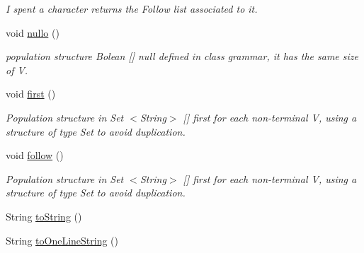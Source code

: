 \begin{DoxyCompactItemize}
\begin{DoxyCompactList}\small\item\em I spent a character returns the Follow list associated to it. \end{DoxyCompactList}\item 
void \hyperlink{classcontext_free_1_1grammar_1_1_context_free_grammar_ac880ed3ca36ddcd8e20d8279af08244d}{nullo} ()
\begin{DoxyCompactList}\small\item\em population structure Bolean \mbox{[}\mbox{]} null defined in class grammar, it has the same size of V. \end{DoxyCompactList}\item 
void \hyperlink{classcontext_free_1_1grammar_1_1_context_free_grammar_a9c3bfe0b038204420b470fab326ce7bb}{first} ()
\begin{DoxyCompactList}\small\item\em Population structure in Set $<$\-String$>$ \mbox{[}\mbox{]} first for each non-\/terminal V, using a structure of type Set to avoid duplication. \end{DoxyCompactList}\item 
void \hyperlink{classcontext_free_1_1grammar_1_1_context_free_grammar_aca5cad8fa908f908d38e0e7e0aa181ed}{follow} ()
\begin{DoxyCompactList}\small\item\em Population structure in Set $<$\-String$>$ \mbox{[}\mbox{]} first for each non-\/terminal V, using a structure of type Set to avoid duplication. \end{DoxyCompactList}\item 
String \hyperlink{classcontext_free_1_1grammar_1_1_context_free_grammar_afd242bd888b53c20465c0bd3675d29d4}{to\-String} ()
\item 
String \hyperlink{classcontext_free_1_1grammar_1_1_context_free_grammar_a922203e2db862d2a8ab31e8e7736273b}{to\-One\-Line\-String} ()
\end{DoxyCompactItemize}
